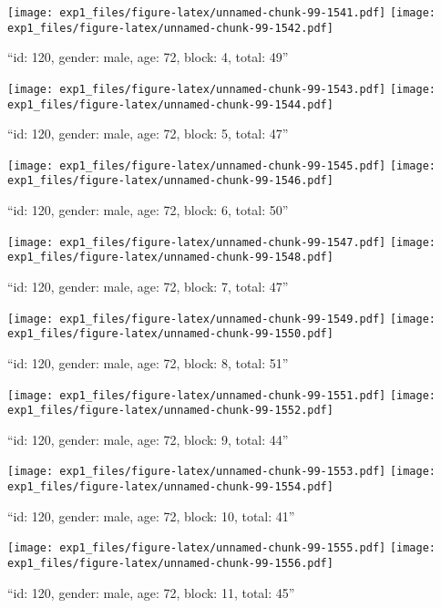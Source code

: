 \documentclass[,]{article}
\begin{document}
\texttt{[image: exp1\_files/figure-latex/unnamed-chunk-99-1541.pdf]}
\texttt{[image: exp1\_files/figure-latex/unnamed-chunk-99-1542.pdf]}

\newpage
[1] 

``id: 120, gender: male, age: 72, block: 4, total: 49''

\texttt{[image: exp1\_files/figure-latex/unnamed-chunk-99-1543.pdf]}
\texttt{[image: exp1\_files/figure-latex/unnamed-chunk-99-1544.pdf]}

\newpage
[1] 

``id: 120, gender: male, age: 72, block: 5, total: 47''

\texttt{[image: exp1\_files/figure-latex/unnamed-chunk-99-1545.pdf]}
\texttt{[image: exp1\_files/figure-latex/unnamed-chunk-99-1546.pdf]}

\newpage
[1] 

``id: 120, gender: male, age: 72, block: 6, total: 50''

\texttt{[image: exp1\_files/figure-latex/unnamed-chunk-99-1547.pdf]}
\texttt{[image: exp1\_files/figure-latex/unnamed-chunk-99-1548.pdf]}

\newpage
[1] 

``id: 120, gender: male, age: 72, block: 7, total: 47''

\texttt{[image: exp1\_files/figure-latex/unnamed-chunk-99-1549.pdf]}
\texttt{[image: exp1\_files/figure-latex/unnamed-chunk-99-1550.pdf]}

\newpage
[1] 

``id: 120, gender: male, age: 72, block: 8, total: 51''

\texttt{[image: exp1\_files/figure-latex/unnamed-chunk-99-1551.pdf]}
\texttt{[image: exp1\_files/figure-latex/unnamed-chunk-99-1552.pdf]}

\newpage
[1] 

``id: 120, gender: male, age: 72, block: 9, total: 44''

\texttt{[image: exp1\_files/figure-latex/unnamed-chunk-99-1553.pdf]}
\texttt{[image: exp1\_files/figure-latex/unnamed-chunk-99-1554.pdf]}

\newpage
[1] 

``id: 120, gender: male, age: 72, block: 10, total: 41''

\texttt{[image: exp1\_files/figure-latex/unnamed-chunk-99-1555.pdf]}
\texttt{[image: exp1\_files/figure-latex/unnamed-chunk-99-1556.pdf]}

\newpage
[1] 

``id: 120, gender: male, age: 72, block: 11, total: 45''
\end{document}
